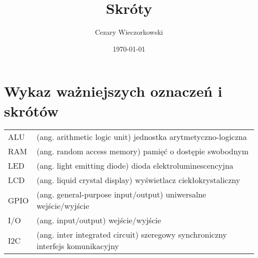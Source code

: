 \documentclass[./main.tex]{subfiles}
\author{Cezary Wieczorkowski}
\date{\today}
\title{Skróty}
\begin{document}
\section*{Wykaz ważniejszych oznaczeń i skrótów}

\begin{tabular}{l p{}}
ALU & (ang. arithmetic logic unit) jednostka arytmetyczno-logiczna\\[0pt]
RAM & (ang. random access memory) pamięć o dostępie swobodnym\\[0pt]
LED & (ang. light emitting diode) dioda elektroluminescencyjna\\[0pt]
LCD & (ang. liquid crystal display) wyświetlacz ciekłokrystaliczny\\[0pt]
GPIO & (ang. general-purpose input/output) uniwersalne wejście/wyjście\\[0pt]
I/O & (ang. input/output) wejście/wyjście\\[0pt]
I2C & (ang. inter integrated circuit) szeregowy synchroniczny interfejs komunikacyjny\\[0pt]
\end{tabular}
\end{document}
